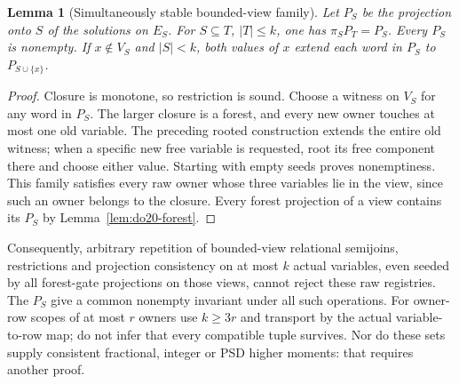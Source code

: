\documentclass[11pt]{article}
\newtheorem{lemma}[theorem]{Lemma}
\begin{document}
\begin{lemma}[Simultaneously stable bounded-view family]\label{lem:do20-views}
Let $P_S$ be the projection onto $S$ of the solutions on $E_S$. For $S\subseteq T$, $|T|\le k$, one has $\pi_S P_T=P_S$. Every $P_S$ is nonempty. If $x\notin V_S$ and $|S|<k$, both values of $x$ extend each word in $P_S$ to $P_{S\cup\{x\}}$.
\end{lemma}
\begin{proof}
Closure is monotone, so restriction is sound. Choose a witness on $V_S$ for any word in $P_S$. The larger closure is a forest, and every new owner touches at most one old variable. The preceding rooted construction extends the entire old witness; when a specific new free variable is requested, root its free component there and choose either value. Starting with empty seeds proves nonemptiness. This family satisfies every raw owner whose three variables lie in the view, since such an owner belongs to the closure. Every forest projection of a view contains its $P_S$ by Lemma~\ref{lem:do20-forest}.
\end{proof}
Consequently, arbitrary repetition of bounded-view relational semijoins, restrictions and projection consistency on at most $k$ actual variables, even seeded by all forest-gate projections on those views, cannot reject these raw registries. The $P_S$ give a common nonempty invariant under all such operations. For owner-row scopes of at most $r$ owners use $k\ge3r$ and transport by the actual variable-to-row map; do not infer that every compatible tuple survives. Nor do these sets supply consistent fractional, integer or PSD higher moments: that requires another proof.
\end{document}
